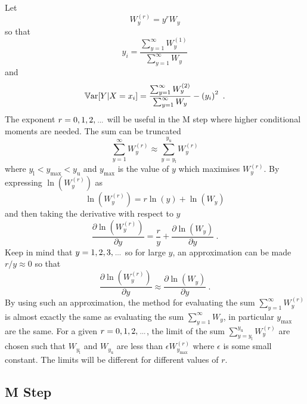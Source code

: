 Let
\begin{equation}
	W_y^{(r)} = y^r W_y
\end{equation}
so that
\begin{equation}
	y_i = \frac{\sum_{y=1}^\infty W^{(1)}_y}{\sum_{y=1}^\infty W_y}
\end{equation}
and
\begin{equation}
	\operatorname{\mathbb{V}ar}[Y|X=x_i] = \frac{\sum_{y=1}^\infty W^{(2)}_y}{\sum_{y=1}^\infty W_y} - \left(y_i\right)^2
	\ .
\end{equation}
The exponent $r=0,1,2,\dotdotdot$ will be useful in the M step where higher conditional moments are needed.
The sum can be truncated
\begin{equation}
	\sum_{y=1}^\infty W^{(r)}_y \approx \sum_{y=y_\text{l}}^{y_\text{u}} W^{(r)}_y
\end{equation}
where $y_\text{l}<y_\text{max}<y_\text{u}$ and $y_\text{max}$ is the value of $y$ which maximises $W_y^{(r)}$. By expressing $\ln(W^{(r)}_y)$ as
\begin{equation}
	\ln\left(W_y^{(r)}\right)=r\ln(y)+\ln(W_y)
\end{equation}
and then taking the derivative with respect to $y$
\begin{equation}
	\frac{\partial \ln(W_y^{(r)})}{\partial y} = \frac{r}{y } + \frac{\partial \ln(W_y)}{\partial y}
	\ .
\end{equation}
Keep in mind that $y=1,2,3,\dotdotdot$ so for large $y$, an approximation can be made $r/y\approx 0$ so that
\begin{equation}
	\frac{\partial \ln(W_y^{(r)})}{\partial y} \approx \frac{\partial \ln(W_y)}{\partial y}
	\ .
\end{equation}
By using such an approximation, the method for evaluating the sum $\sum_{y=1}^\infty W^{(r)}_y$ is almost exactly the same as evaluating the sum $\sum_{y=1}^\infty W_y$, in particular $y_\text{max}$ are the same. For a given $r=0,1,2,\dotdotdot$, the limit of the sum $\sum_{y=y_\text{l}}^{y_\text{u}} W^{(r)}_y$ are chosen such that $W_{y_\text{l}}$ and $W_{y_\text{u}}$ are less than $\epsilon W_{y_\text{max}}^{(r)}$ where $\epsilon$ is some small constant. The limits will be different for different values of $r$.

\subsection{M Step}

